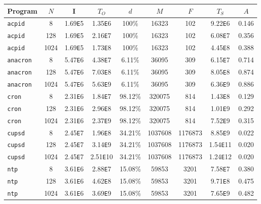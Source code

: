 \begin{table} [h]
\begin{center}
\begin{tabular}{|l||c|c||c||c|c|c||c||c|}\hline
  Program & $N$ & I & $T_O$ & $d$ & $M$ & $F$ & $T_S$ & $A$ \\\hline \hline
  \texttt{acpid} & 8 & 1.69\texttt{E}5 & 1.35\texttt{E}6 & 100\% & 16323 & 102 & 9.22\texttt{E}6 & 0.146 \\\hline
  \texttt{acpid} & 128 & 1.69\texttt{E}5 & 2.16\texttt{E}7 & 100\% & 16323 & 102 & 6.08\texttt{E}7 & 0.356 \\\hline
  \texttt{acpid} & 1024 & 1.69\texttt{E}5 & 1.73\texttt{E}8 & 100\% & 16323 & 102 & 4.45\texttt{E}8 & 0.388 \\\hline
  \hline

  \texttt{anacron} & 8 & 5.47\texttt{E}6 & 4.38\texttt{E}7 & 6.11\% & 36095 & 309 & 6.15\texttt{E}7 & 0.714  \\\hline
  \texttt{anacron} & 128 & 5.47\texttt{E}6 & 7.03\texttt{E}8 & 6.11\% & 36095 & 309 & 8.05\texttt{E}8 & 0.874  \\\hline
  \texttt{anacron} & 1024 & 5.47\texttt{E}6 & 5.63\texttt{E}9 & 6.11\% & 36095 & 309 & 6.36\texttt{E}9 & 0.886  \\\hline
  \hline

  \texttt{cron} & 8 & 2.31\texttt{E}6 & 1.84\texttt{E}7 & 98.12\% & 320075 & 814 & 1.43\texttt{E}8 & 0.129  \\\hline
  \texttt{cron} & 128 & 2.31\texttt{E}6 & 2.96\texttt{E}8 & 98.12\% & 320075 & 814 & 1.01\texttt{E}9 & 0.292  \\\hline
  \texttt{cron} & 1024 & 2.31\texttt{E}6 & 2.37\texttt{E}9 & 98.12\% & 320075 & 814 & 7.52\texttt{E}9 & 0.315  \\\hline
  \hline

  \texttt{cupsd} & 8 & 2.45\texttt{E}7 & 1.96\texttt{E}8 & 34.21\% & 1037608 & 1176873 & 8.85\texttt{E}9 & 0.022  \\\hline
  \texttt{cupsd} & 128 & 2.45\texttt{E}7 & 3.14\texttt{E}9 & 34.21\% & 1037608 & 1176873 & 1.54\texttt{E}11 & 0.020  \\\hline
  \texttt{cupsd} & 1024 & 2.45\texttt{E}7 & 2.51\texttt{E}10 & 34.21\% & 1037608 & 1176873 & 1.24\texttt{E}12 & 0.020  \\\hline
  \hline

  \texttt{ntp} & 8 & 3.61\texttt{E}6 & 2.88\texttt{E}7 & 15.08\% & 59853 & 3201 & 7.58\texttt{E}7 & 0.380  \\\hline
  \texttt{ntp} & 128 & 3.61\texttt{E}6 & 4.62\texttt{E}8 & 15.08\% & 59853 & 3201 & 9.71\texttt{E}8 & 0.475  \\\hline
  \texttt{ntp} & 1024 & 3.61\texttt{E}6 & 3.69\texttt{E}9 & 15.08\% & 59853 & 3201 & 7.65\texttt{E}9 & 0.482  \\\hline
  

\end{tabular}
\end{center}
\end{table}
